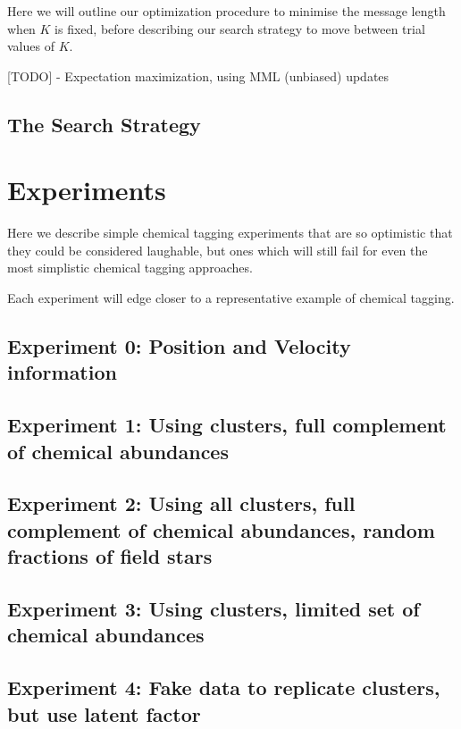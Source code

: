 \documentclass{aastex61}
\begin{document}
Here we will outline our optimization procedure to minimise the message length
when $K$ is fixed, before describing our search strategy to move between trial 
values of $K$.

[TODO]
- Expectation maximization, using MML (unbiased) updates

\subsection{The Search Strategy}
\label{sec:search-strategy}


\section{Experiments}
\label{sec:experiments}

Here we describe simple chemical tagging experiments that are so optimistic
that they could be considered laughable, but ones which will still fail for
even the most simplistic chemical tagging approaches.

Each experiment will edge closer to a representative example of chemical
tagging.

\subsection{Experiment 0: Position and Velocity information}

\subsection{Experiment 1: Using clusters, full complement of chemical abundances}

\subsection{Experiment 2: Using all clusters, full complement of chemical abundances, random fractions of field stars}

\subsection{Experiment 3: Using clusters, limited set of chemical abundances}

\subsection{Experiment 4: Fake data to replicate clusters, but use latent factor}
\end{document}
